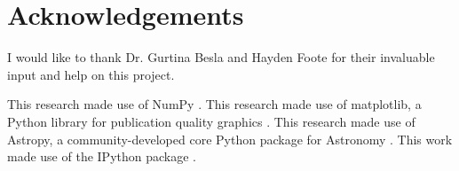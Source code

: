 \documentclass[linenumbers, ]{aastex631}
\begin{document}
\section{Acknowledgements}
I would like to thank Dr. Gurtina Besla and Hayden Foote for their invaluable input and help on this project.

This research made use of NumPy \citep{harris2020array}. This research made use of matplotlib, a Python library for publication quality graphics \citep{Hunter:2007}. This research made use of Astropy, a community-developed core Python package for Astronomy \citep{2018AJ....156..123A, 2013A&A...558A..33A}. This work made use of the IPython package \citep{PER-GRA:2007}.

{}

\end{document}

